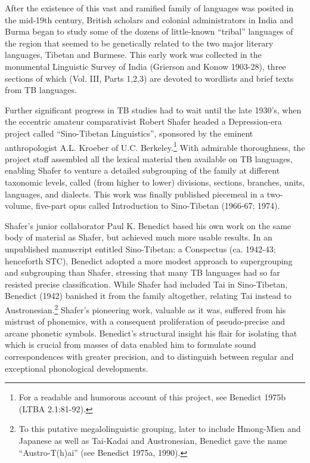 After the existence of this vast and ramified family of languages was posited in the mid-19th century, British scholars and colonial administrators in India and Burma began to study some of the dozens of little-known “tribal” languages of the region that seemed to be genetically related to the two major literary languages, Tibetan and Burmese. This early work was collected in the monumental Linguistic Survey of India (Grierson and Konow 1903-28), three sections of which (Vol. III, Parts 1,2,3) are devoted to wordlists and brief texts from TB languages.

Further significant progress in TB studies had to wait until the late 1930's, when the eccentric amateur comparativist Robert Shafer headed a Depression-era project called “Sino-Tibetan Linguistics”, sponsored by the eminent anthropologist A.L. Kroeber of U.C. Berkeley.\footnote{For a readable and humorous account of this project, see Benedict 1975b (LTBA 2.1:81-92).} With admirable thoroughness, the project staff assembled all the lexical material then available on TB languages, enabling Shafer to venture a detailed subgrouping of the family at different taxonomic levels, called (from higher to lower) divisions, sections, branches, units, languages, and dialects. This work was finally published piecemeal in a two-volume, five-part opus called Introduction to Sino-Tibetan (1966-67; 1974).

Shafer’s junior collaborator Paul K. Benedict based his own work on the same body of material as Shafer, but achieved much more usable results. In an unpublished manuscript entitled Sino-Tibetan: a Conspectus (ca. 1942-43; henceforth STC), Benedict adopted a more modest approach to supergrouping and subgrouping than Shafer, stressing that many TB languages had so far resisted precise classification. While Shafer had included Tai in Sino-Tibetan, Benedict (1942) banished it from the family altogether, relating Tai instead to Austronesian.\footnote{To this putative megalolinguistic grouping, later to include Hmong-Mien and Japanese as well as Tai-Kadai and Austronesian, Benedict gave the name “Austro-T(h)ai” (see Benedict 1975a, 1990).} Shafer’s pioneering work, valuable as it was, suffered from his mistrust of phonemics, with a consequent proliferation of pseudo-precise and arcane phonetic symbols. Benedict’s structural insight  his flair for isolating that which is crucial from masses of data  enabled him to formulate sound correspondences with greater precision, and to distinguish between regular and exceptional phonological developments.

